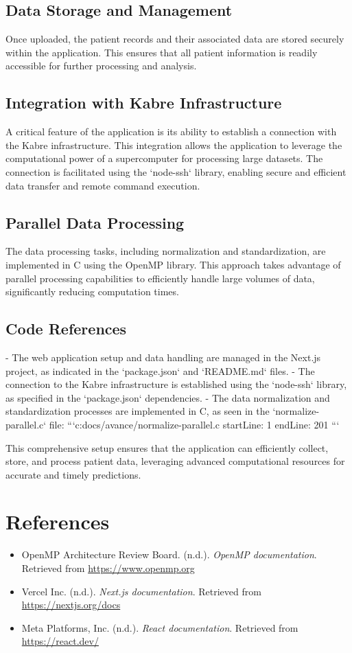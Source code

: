 \documentclass[a4paper,12pt]{report}
\begin{document}
\section{Data Storage and Management}
Once uploaded, the patient records and their associated data are stored securely within the application. This ensures that all patient information is readily accessible for further processing and analysis.

\section{Integration with Kabre Infrastructure}
A critical feature of the application is its ability to establish a connection with the Kabre infrastructure. This integration allows the application to leverage the computational power of a supercomputer for processing large datasets. The connection is facilitated using the `node-ssh` library, enabling secure and efficient data transfer and remote command execution.

\section{Parallel Data Processing}
The data processing tasks, including normalization and standardization, are implemented in C using the OpenMP library. This approach takes advantage of parallel processing capabilities to efficiently handle large volumes of data, significantly reducing computation times.

\section{Code References}
- The web application setup and data handling are managed in the Next.js project, as indicated in the `package.json` and `README.md` files.
- The connection to the Kabre infrastructure is established using the `node-ssh` library, as specified in the `package.json` dependencies.
- The data normalization and standardization processes are implemented in C, as seen in the `normalize-parallel.c` file:
  ```c:docs/avance/normalize-parallel.c
  startLine: 1
  endLine: 201
  ```

This comprehensive setup ensures that the application can efficiently collect, store, and process patient data, leveraging advanced computational resources for accurate and timely predictions.

\chapter{References}
\begin{itemize}
    \item OpenMP Architecture Review Board. (n.d.). \textit{OpenMP documentation}. Retrieved from \url{https://www.openmp.org}
    \item Vercel Inc. (n.d.). \textit{Next.js documentation}. Retrieved from \url{https://nextjs.org/docs}
    \item Meta Platforms, Inc. (n.d.). \textit{React documentation}. Retrieved from \url{https://react.dev/}
\end{itemize}
\end{document}
